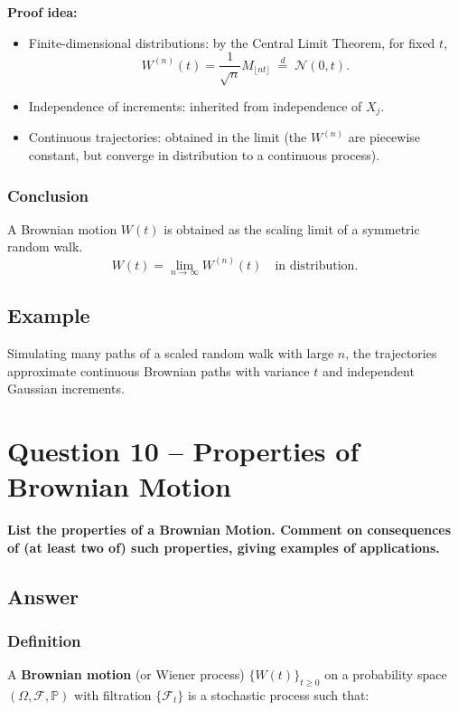 \documentclass[12pt,a4paper]{book}
\theoremstyle{remark}
\newcommand{\PP}{\mathbb{P}}          %
\newcommand{\F}{\mathcal{F}}          %
\newcommand{\Normal}{\mathcal{N}}
\newcommand{\law}{\stackrel{d}{=}}    %
\begin{document}
\textbf{Proof idea:}
\begin{itemize}
    \item Finite-dimensional distributions: by the Central Limit Theorem, for fixed $t$, 
    \[
    W^{(n)}(t) = \frac{1}{\sqrt{n}}M_{\lfloor nt \rfloor} \;\law\; \Normal(0,t).
    \]
    \item Independence of increments: inherited from independence of $X_j$.
    \item Continuous trajectories: obtained in the limit (the $W^{(n)}$ are piecewise constant, but converge in distribution to a continuous process).
\end{itemize}

\subsubsection*{Conclusion}
A Brownian motion $W(t)$ is obtained as the scaling limit of a symmetric random walk.  
\[
W(t) = \lim_{n\to\infty} W^{(n)}(t) \quad \text{in distribution}.
\]

\subsection*{Example}
Simulating many paths of a scaled random walk with large $n$, the trajectories approximate continuous Brownian paths with variance $t$ and independent Gaussian increments.








\newpage
\section{Question 10 -- Properties of Brownian Motion}
\textbf{List the properties of a Brownian Motion. Comment on consequences of (at least two of) such properties, giving examples of applications.}

\subsection*{Answer}

\subsubsection*{Definition}
A \textbf{Brownian motion} (or Wiener process) $\{W(t)\}_{t\ge 0}$ on a probability space $(\Omega,\F,\PP)$ with filtration $\{\F_t\}$ is a stochastic process such that:
\end{document}
